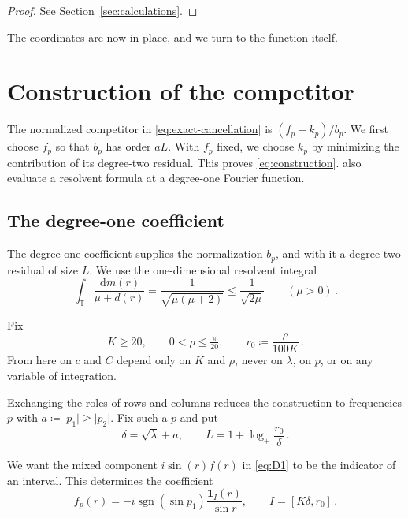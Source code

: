 \documentclass[11pt]{amsart}
\theoremstyle{plain}
\theoremstyle{definition}
\newcommand{\T}{\mathbb T}
\newcommand{\1}{\mathbf 1}
\newcommand{\abs}[1]{\lvert #1\rvert}
\newcommand{\dd}{\,\mathrm d}
\newcommand{\sgn}{\operatorname{sgn}}
\begin{document}
\begin{proof}
See Section~\ref{sec:calculations}.
\end{proof}

The coordinates are now in place, and we turn to the function itself.

\section{Construction of the competitor}\label{sec:evaluation}

The normalized competitor in \eqref{eq:exact-cancellation} is
$(f_p+k_p)/b_p$.  We first choose $f_p$ so that $b_p$ has order $aL$.  With
$f_p$ fixed, we choose $k_p$ by minimizing the contribution of its
degree-two residual.  This proves \eqref{eq:construction}.
\citet*[Section~2]{LTV18} also evaluate a resolvent formula at a degree-one
Fourier function.

\subsection{The degree-one coefficient}\label{ssec:degree-one}

The degree-one coefficient supplies the normalization $b_p$, and with it a
degree-two residual of size $L$.  We use the one-dimensional resolvent
integral
\begin{equation}\label{eq:line-integral}
  \int_\T\frac{\dd m(r)}{\mu+d(r)}
  =\frac1{\sqrt{\mu(\mu+2)}}\leq\frac1{\sqrt{2\mu}}
  \qquad(\mu>0)\, .
\end{equation}

Fix
\begin{equation}\label{eq:params}
  K\geq20,\qquad
  0<\rho\leq\tfrac\pi{20},\qquad r_0\coloneqq\frac\rho{100K}\, .
\end{equation}
From here on $c$ and $C$ depend only on $K$ and $\rho$, never on $\lambda$,
on $p$, or on any variable of integration.

Exchanging the roles of rows and columns reduces the construction to
frequencies $p$ with $a\coloneqq\abs{p_1}\geq\abs{p_2}$.  Fix such a $p$ and
put
\begin{equation}\label{eq:degree-one-parameters}
  \delta=\sqrt\lambda+a,\qquad
  L=1+\log_+\frac{r_0}\delta\, .
\end{equation}

We want the mixed component $i\sin(r)f(r)$ in \eqref{eq:D1} to be the
indicator of an interval.  This determines the coefficient
\begin{equation}\label{eq:f}
  f_p(r)=-i\sgn(\sin p_1)\frac{\1_I(r)}{\sin r},
  \qquad I=[K\delta,r_0]\, .
\end{equation}
\end{document}
